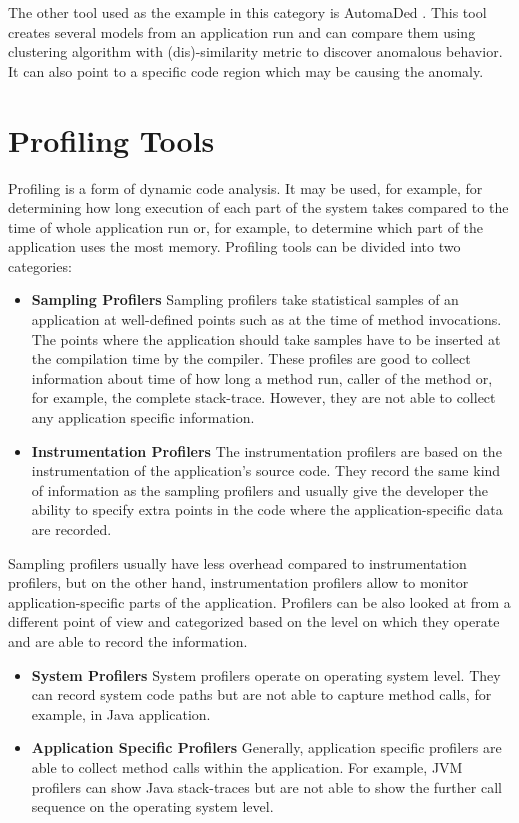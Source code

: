 The other tool used as the example in this category is AutomaDed \cite{HPC}. This tool creates several models from an application run and can compare them using clustering algorithm with (dis)-similarity metric to discover anomalous behavior. It can also point to a specific code region which may be causing the anomaly.

\section{Profiling Tools}
Profiling is a form of dynamic code analysis. It may be used, for example, for determining how long execution of each part of the system takes compared to the time of whole application run or, for example, to determine which part of the application uses the most memory. Profiling tools can be divided into two categories:
\begin{itemize}
	\item \textbf{Sampling Profilers} \newline
Sampling profilers take statistical samples of an application at well-defined points such as at the time of method invocations. The points where the application should take samples have to be inserted at the compilation time by the compiler. These profiles are good to collect information about time of how long a method run, caller of the method or, for example, the complete stack-trace. However, they are not able to collect any application specific information.
	\item \textbf{Instrumentation Profilers} \newline
The instrumentation profilers are based on the instrumentation of the application's source code. They record the same kind of information as the sampling profilers and usually give the developer the ability to specify extra points in the code where the application-specific data are recorded. 
\end{itemize}
 Sampling profilers usually have less overhead compared to instrumentation profilers, but on the other hand, instrumentation profilers allow to monitor application-specific parts of the application. Profilers can be also looked at from a different point of view and categorized based on the level on which they operate and are able to record the information.
\begin{itemize}
	\item \textbf{System Profilers} \newline
	System profilers operate on operating system level. They can record system code paths but are not able to capture method calls, for example, in Java application.
	\item \textbf{Application Specific Profilers} \newline
	Generally, application specific profilers are able to collect method calls within the application. For example, JVM profilers can show Java stack-traces but are not able to show the further call sequence on the operating system level.

\end{itemize}
